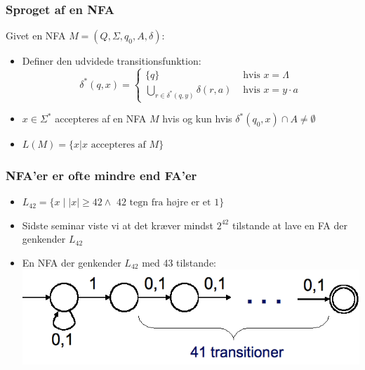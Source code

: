 \begin{frame}
\frametitle{Sproget af en NFA}
Givet en NFA $M=(Q, \Sigma, q_0, A, \delta)$:
\begin{itemize}[<+->]
\item Definer den udvidede transitionsfunktion:
\[\delta^*(q, x) = \begin{cases}
  \{q\} & \text{ hvis } x=\Lambda \\
  \bigcup_{r\in \delta^*(q,y)}\delta(r, a)& \text{ hvis } x=y\cdot a
\end{cases}
\]
\item $x\in \Sigma^*$ accepteres af en NFA $M$ hvis og kun hvis $\delta^*(q_0,x) \cap A \neq \emptyset$
\item $L(M)=\{x | x \text{ accepteres af } M\}$
\end{itemize}
\end{frame}
\begin{frame}
\frametitle{NFA'er er ofte mindre end FA'er}
\begin{itemize}[<+->]
\item $L_{42}=\{x \mid |x|\geq 42 \wedge \text{ 42 tegn fra højre er et 1} \}$
\item Sidste seminar viste vi at det kræver mindst $2^{42}$ tilstande
  at lave en FA der genkender $L_{42}$
\item En \alert{N}FA der genkender $L_{42}$ med 43 tilstande:
\includegraphics[scale=0.4]{images/2_seminar_L42_NFA}
\end{itemize}
\end{frame}
